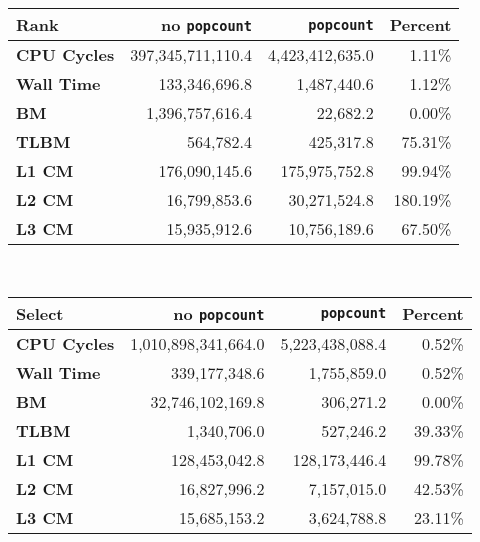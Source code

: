 \begin{tabular}{|l|r|r|r|}
\hline
\textbf{Rank} & no \texttt{popcount} & \texttt{popcount} & Percent \\ \hline
\textbf{CPU Cycles} & 397,345,711,110.4 & 4,423,412,635.0 & 1.11\% \\ \hline
\textbf{Wall Time} & 133,346,696.8 & 1,487,440.6 & 1.12\% \\ \hline
\textbf{BM} & 1,396,757,616.4 & 22,682.2 & 0.00\% \\ \hline
\textbf{TLBM} & 564,782.4 & 425,317.8 & 75.31\% \\ \hline
\textbf{L1 CM} & 176,090,145.6 & 175,975,752.8 & 99.94\% \\ \hline
\textbf{L2 CM} & 16,799,853.6 & 30,271,524.8 & 180.19\% \\ \hline
\textbf{L3 CM} & 15,935,912.6 & 10,756,189.6 & 67.50\% \\ \hline
\end{tabular}\\[5pt]
\begin{tabular}{|l|r|r|r|}
\hline
\textbf{Select} & no \texttt{popcount} & \texttt{popcount} & Percent \\ \hline
\textbf{CPU Cycles} & 1,010,898,341,664.0 & 5,223,438,088.4 & 0.52\% \\ \hline
\textbf{Wall Time} & 339,177,348.6 & 1,755,859.0 & 0.52\% \\ \hline
\textbf{BM} & 32,746,102,169.8 & 306,271.2 & 0.00\% \\ \hline
\textbf{TLBM} & 1,340,706.0 & 527,246.2 & 39.33\% \\ \hline
\textbf{L1 CM} & 128,453,042.8 & 128,173,446.4 & 99.78\% \\ \hline
\textbf{L2 CM} & 16,827,996.2 & 7,157,015.0 & 42.53\% \\ \hline
\textbf{L3 CM} & 15,685,153.2 & 3,624,788.8 & 23.11\% \\ \hline
\end{tabular}\\[5pt]
